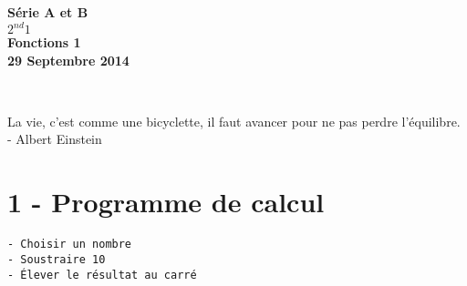 \documentclass[11pt]{article}
\begin{document}

\begin{minipage}[t]{\textwidth}
  \raggedright
      {\bfseries Série A et B}\\[.35ex]
      {\bfseries $2^{nd}1$}\\[.35ex]
      \vspace*{-1cm}
      \raggedleft
          {\bfseries Fonctions 1}\\[.35ex]
          {\bfseries 29 Septembre 2014}\\[.35ex]
\end{minipage}\\[1em]

\begin{center}
  \textsf{La vie, c'est comme une bicyclette, il faut avancer pour ne pas perdre l'équilibre. - Albert Einstein}\\
\end{center}

\setlength{\columnseprule}{1pt}

\section*{1 - Programme de calcul}

\begin{verbatim}
- Choisir un nombre
- Soustraire 10
- Élever le résultat au carré
\end{verbatim}
\end{document}
